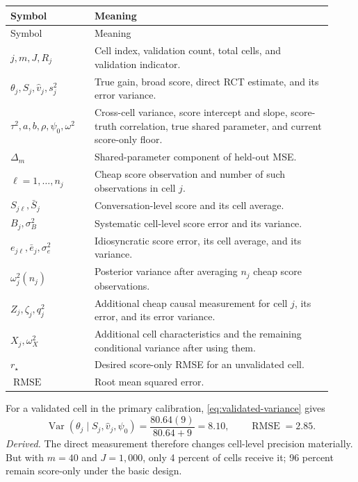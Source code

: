 \documentclass[11pt]{article}
\newcommand{\Var}{\operatorname{Var}}
\begin{document}
\begin{longtable}{>{\raggedright\arraybackslash}p{0.24\linewidth}
                  >{\raggedright\arraybackslash}p{0.68\linewidth}}
\hline
Symbol & Meaning \\
\hline
\endfirsthead
\hline
Symbol & Meaning \\
\hline
\endhead
\(j,m,J,R_j\) & Cell index, validation count, total cells, and validation
indicator. \\
\(\theta_j,S_j,\widehat v_j,s_j^2\) & True gain, broad score, direct RCT
estimate, and its error variance. \\
\(\tau^2,a,b,\rho,\psi_0,\omega^2\) & Cross-cell variance, score intercept
and slope, score-truth correlation, true shared parameter, and current
score-only floor. \\
\(\Delta_m\) & Shared-parameter component of held-out MSE. \\
\(\ell=1,\ldots,n_j\) & Cheap score observation and number of such
observations in cell \(j\). \\
\(S_{j\ell},\bar S_j\) & Conversation-level score and its cell average. \\
\(B_j,\sigma_B^2\) & Systematic cell-level score error and its variance. \\
\(e_{j\ell},\bar e_j,\sigma_e^2\) & Idiosyncratic score error, its cell
average, and its variance. \\
\(\omega_j^2(n_j)\) & Posterior variance after averaging \(n_j\) cheap score
observations. \\
\(Z_j,\zeta_j,q_j^2\) & Additional cheap causal measurement for cell \(j\),
its error, and its error variance. \\
\(X_j,\omega_X^2\) & Additional cell characteristics and the remaining
conditional variance after using them. \\
\(r_\star\) & Desired score-only RMSE for an unvalidated cell. \\
\(\operatorname{RMSE}\) & Root mean squared error. \\
\hline
\end{longtable}

For a validated cell in the primary calibration, \eqref{eq:validated-variance}
gives
\begin{equation}
 \Var(\theta_j\mid S_j,\widehat v_j,\psi_0)
 =\frac{80.64(9)}{80.64+9}=8.10,
 \qquad
 \operatorname{RMSE}=2.85.
 \label{eq:validated-numeric}
\end{equation}
\emph{Derived.} The direct measurement therefore changes cell-level
precision materially. But with \(m=40\) and \(J=1{,}000\), only 4 percent of
cells receive it; 96 percent remain score-only under the basic design.
\end{document}
